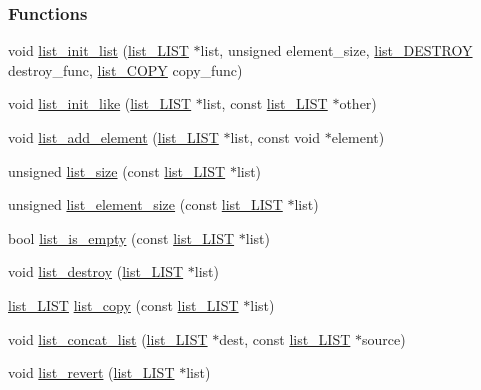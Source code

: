 \subsubsection*{Functions}
\begin{DoxyCompactItemize}
\item 
void \hyperlink{a00010_a1d2b26917d529007b957a4643c2cefa4}{list\-\_\-init\-\_\-list} (\hyperlink{a00004}{list\-\_\-\-L\-I\-S\-T} $\ast$list, unsigned element\-\_\-size, \hyperlink{a00010_af9f798ca7814dd1b5ef32b7ecfa7462f}{list\-\_\-\-D\-E\-S\-T\-R\-O\-Y} destroy\-\_\-func, \hyperlink{a00010_a17ecf184324f5152136d35a721def4b3}{list\-\_\-\-C\-O\-P\-Y} copy\-\_\-func)
\item 
void \hyperlink{a00010_a699a1a35f9054c6dc82ce9ee1845843f}{list\-\_\-init\-\_\-like} (\hyperlink{a00004}{list\-\_\-\-L\-I\-S\-T} $\ast$list, const \hyperlink{a00004}{list\-\_\-\-L\-I\-S\-T} $\ast$other)
\item 
void \hyperlink{a00010_ac30216cf9b9cdf221aa68f1e2f819d9a}{list\-\_\-add\-\_\-element} (\hyperlink{a00004}{list\-\_\-\-L\-I\-S\-T} $\ast$list, const void $\ast$element)
\item 
unsigned \hyperlink{a00010_ad45f8ded6762e1de3627829064d9b5e9}{list\-\_\-size} (const \hyperlink{a00004}{list\-\_\-\-L\-I\-S\-T} $\ast$list)
\item 
unsigned \hyperlink{a00010_aa55f63880ae1e6ea175c26ed2e6e2da2}{list\-\_\-element\-\_\-size} (const \hyperlink{a00004}{list\-\_\-\-L\-I\-S\-T} $\ast$list)
\item 
bool \hyperlink{a00010_a9cbeca339af8257f88a466490d02b818}{list\-\_\-is\-\_\-empty} (const \hyperlink{a00004}{list\-\_\-\-L\-I\-S\-T} $\ast$list)
\item 
void \hyperlink{a00010_a8a7dff7af74ccfabc9997d1505e1cb3a}{list\-\_\-destroy} (\hyperlink{a00004}{list\-\_\-\-L\-I\-S\-T} $\ast$list)
\item 
\hyperlink{a00004}{list\-\_\-\-L\-I\-S\-T} \hyperlink{a00010_ab993127d4cd88ea8e379c4448e33dd07}{list\-\_\-copy} (const \hyperlink{a00004}{list\-\_\-\-L\-I\-S\-T} $\ast$list)
\item 
void \hyperlink{a00010_aed56e847043db6a0171561029b2d2b1e}{list\-\_\-concat\-\_\-list} (\hyperlink{a00004}{list\-\_\-\-L\-I\-S\-T} $\ast$dest, const \hyperlink{a00004}{list\-\_\-\-L\-I\-S\-T} $\ast$source)
\item 
void \hyperlink{a00010_a02924a0a3efce2aa3a6b6f90d788e6f4}{list\-\_\-revert} (\hyperlink{a00004}{list\-\_\-\-L\-I\-S\-T} $\ast$list)
\end{DoxyCompactItemize}


